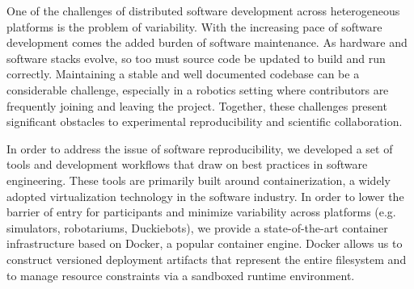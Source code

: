 \documentclass[12pt,initial,twoside,maitrise]{dms}
\numberwithin{equation}{section}
\numberwithin{table}{chapter}
\numberwithin{figure}{chapter}
\begin{document}
One of the challenges of distributed software development across heterogeneous platforms is the problem of variability. With the increasing pace of software development comes the added burden of software maintenance. As hardware and software stacks evolve, so too must source code be updated to build and run correctly. Maintaining a stable and well documented codebase can be a considerable challenge, especially in a robotics setting where contributors are frequently joining and leaving the project. Together, these challenges present significant obstacles to experimental reproducibility and scientific collaboration.

In order to address the issue of software reproducibility, we developed a set of tools and development workflows that draw on best practices in software engineering. These tools are primarily built around containerization, a widely adopted virtualization technology in the software industry. In order to lower the barrier of entry for participants and minimize variability across platforms (e.g. simulators, robotariums, Duckiebots), we provide a state-of-the-art container infrastructure based on Docker, a popular container engine. Docker allows us to construct versioned deployment artifacts that represent the entire filesystem and to manage resource constraints via a sandboxed runtime environment.
\end{document}
